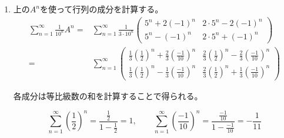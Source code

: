 \documentclass[12pt,b5paper]{ltjsarticle}
\begin{document}
\begin{enumerate}
      \dotfill
 \item
      上の$A^n$を使って行列の成分を計算する。
      \begin{align}
       \sum_{n=1}^{\infty}\frac{1}{10^n}A^n
        =& \sum_{n=1}^{\infty}\frac{1}{3\cdot 10^n}\begin{pmatrix} 5^n+2(-1)^n & 2\cdot 5^n-2(-1)^n \\ 5^n-(-1)^n & 2\cdot 5^n+(-1)^n \end{pmatrix}\\
       =& \sum_{n=1}^{\infty}
       \begin{pmatrix}
         \frac{1}{3}\left(\frac{1}{2}\right)^n+\frac{2}{3}\left(\frac{-1}{10}\right)^n & \frac{2}{3}\left(\frac{1}{2}\right)^n-\frac{2}{3}\left(\frac{-1}{10}\right)^n \\
       \frac{1}{3}\left(\frac{1}{2}\right)^n-\frac{1}{3}\left(\frac{-1}{10}\right)^n & \frac{2}{3}\left(\frac{1}{2}\right)^n+\frac{1}{3}\left(\frac{-1}{10}\right)^n
       \end{pmatrix}%
      \end{align}

      各成分は等比級数の和を計算することで得られる。

      \begin{equation}
       \sum_{n=1}^{\infty}\left(\frac{1}{2}\right)^n = \frac{\frac{1}{2}}{1-\frac{1}{2}} = 1
        ,\qquad
       \sum_{n=1}^{\infty}\left(\frac{-1}{10}\right)^n = \frac{\frac{-1}{10}}{1-\frac{-1}{10}} = -\frac{1}{11}
      \end{equation}


\end{enumerate}
\end{document}
